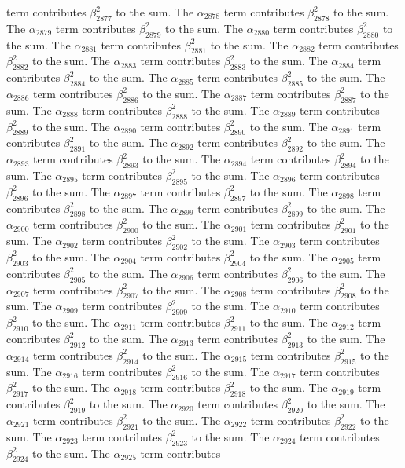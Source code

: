 \begin{lemma}
term contributes $\beta_{2877}^{2}$ to the sum. The $\alpha_{2878}$ term contributes $\beta_{2878}^{2}$ to the sum. The $\alpha_{2879}$ term contributes $\beta_{2879}^{2}$ to the sum. The $\alpha_{2880}$ term contributes $\beta_{2880}^{2}$ to the sum. The $\alpha_{2881}$ term contributes $\beta_{2881}^{2}$ to the sum. The $\alpha_{2882}$ term contributes $\beta_{2882}^{2}$ to the sum. The $\alpha_{2883}$ term contributes $\beta_{2883}^{2}$ to the sum. The $\alpha_{2884}$ term contributes $\beta_{2884}^{2}$ to the sum. The $\alpha_{2885}$ term contributes $\beta_{2885}^{2}$ to the sum. The $\alpha_{2886}$ term contributes $\beta_{2886}^{2}$ to the sum. The $\alpha_{2887}$ term contributes $\beta_{2887}^{2}$ to the sum. The $\alpha_{2888}$ term contributes $\beta_{2888}^{2}$ to the sum. The $\alpha_{2889}$ term contributes $\beta_{2889}^{2}$ to the sum. The $\alpha_{2890}$ term contributes $\beta_{2890}^{2}$ to the sum. The $\alpha_{2891}$ term contributes $\beta_{2891}^{2}$ to the sum. The $\alpha_{2892}$ term contributes $\beta_{2892}^{2}$ to the sum. The $\alpha_{2893}$ term contributes $\beta_{2893}^{2}$ to the sum. The $\alpha_{2894}$ term contributes $\beta_{2894}^{2}$ to the sum. The $\alpha_{2895}$ term contributes $\beta_{2895}^{2}$ to the sum. The $\alpha_{2896}$ term contributes $\beta_{2896}^{2}$ to the sum. The $\alpha_{2897}$ term contributes $\beta_{2897}^{2}$ to the sum. The $\alpha_{2898}$ term contributes $\beta_{2898}^{2}$ to the sum. The $\alpha_{2899}$ term contributes $\beta_{2899}^{2}$ to the sum. The $\alpha_{2900}$ term contributes $\beta_{2900}^{2}$ to the sum. The $\alpha_{2901}$ term contributes $\beta_{2901}^{2}$ to the sum. The $\alpha_{2902}$ term contributes $\beta_{2902}^{2}$ to the sum. The $\alpha_{2903}$ term contributes $\beta_{2903}^{2}$ to the sum. The $\alpha_{2904}$ term contributes $\beta_{2904}^{2}$ to the sum. The $\alpha_{2905}$ term contributes $\beta_{2905}^{2}$ to the sum. The $\alpha_{2906}$ term contributes $\beta_{2906}^{2}$ to the sum. The $\alpha_{2907}$ term contributes $\beta_{2907}^{2}$ to the sum. The $\alpha_{2908}$ term contributes $\beta_{2908}^{2}$ to the sum. The $\alpha_{2909}$ term contributes $\beta_{2909}^{2}$ to the sum. The $\alpha_{2910}$ term contributes $\beta_{2910}^{2}$ to the sum. The $\alpha_{2911}$ term contributes $\beta_{2911}^{2}$ to the sum. The $\alpha_{2912}$ term contributes $\beta_{2912}^{2}$ to the sum. The $\alpha_{2913}$ term contributes $\beta_{2913}^{2}$ to the sum. The $\alpha_{2914}$ term contributes $\beta_{2914}^{2}$ to the sum. The $\alpha_{2915}$ term contributes $\beta_{2915}^{2}$ to the sum. The $\alpha_{2916}$ term contributes $\beta_{2916}^{2}$ to the sum. The $\alpha_{2917}$ term contributes $\beta_{2917}^{2}$ to the sum. The $\alpha_{2918}$ term contributes $\beta_{2918}^{2}$ to the sum. The $\alpha_{2919}$ term contributes $\beta_{2919}^{2}$ to the sum. The $\alpha_{2920}$ term contributes $\beta_{2920}^{2}$ to the sum. The $\alpha_{2921}$ term contributes $\beta_{2921}^{2}$ to the sum. The $\alpha_{2922}$ term contributes $\beta_{2922}^{2}$ to the sum. The $\alpha_{2923}$ term contributes $\beta_{2923}^{2}$ to the sum. The $\alpha_{2924}$ term contributes $\beta_{2924}^{2}$ to the sum. The $\alpha_{2925}$ term contributes 
\end{lemma}
